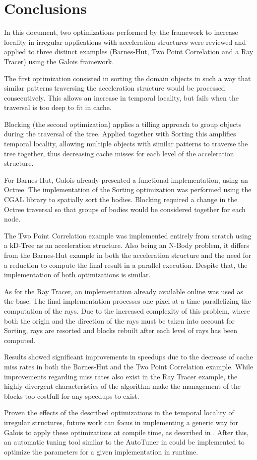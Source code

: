 \section{Conclusions}
\label{sec:conclusion}

In this document, two optimizations performed by the \treetiler framework to increase locality in irregular applications with acceleration structures were reviewed and applied to three distinct examples (Barnes-Hut, Two Point Correlation and a Ray Tracer) using the Galois framework.

The first optimization consisted in sorting the domain objects in such a way that similar patterns traversing the acceleration structure would be processed consecutively. This allows an increase in temporal locality, but fails when the traversal is too deep to fit in cache.

Blocking (the second optimization) applies a tilling approach to group objects during the traversal of the tree. Applied together with Sorting this amplifies temporal locality, allowing multiple objects with similar patterns to traverse the tree together, thus decreasing cache misses for each level of the acceleration structure.

For Barnes-Hut, Galois already presented a functional implementation, using an Octree. The implementation of the Sorting optimization was performed using the CGAL library to spatially sort the bodies. Blocking required a change in the Octree traversal so that groups of bodies would be considered together for each node.

The Two Point Correlation example was implemented entirely from scratch using a kD-Tree as an acceleration structure. Also being an N-Body problem, it differs from the Barnes-Hut example in both the acceleration structure and the need for a reduction to compute the final result in a parallel execution. Despite that, the implementation of both optimizations is similar.

As for the Ray Tracer, an implementation already available online was used as the base. The final implementation processes one pixel at a time parallelizing the computation of the rays. Due to the increased complexity of this problem, where both the origin and the direction of the rays must be taken into account for Sorting, rays are resorted and blocks rebuilt after each level of rays has been computed.

Results showed significant improvements in speedups due to the decrease of cache miss rates in both the Barnes-Hut and the Two Point Correlation example. While improvements regarding miss rates also exist in the Ray Tracer example, the highly divergent characteristics of the algorithm make the management of the blocks too costfull for any speedups to exist.

Proven the effects of the described optimizations in the temporal locality of irregular structures, future work can focus in implementing a generic way for Galois to apply these optimizations at compile time, as described in \cite{tree_tiler}. After this, an automatic tuning tool similar to the AutoTuner in \treetiler could be implemented to optimize the parameters for a given implementation in runtime.